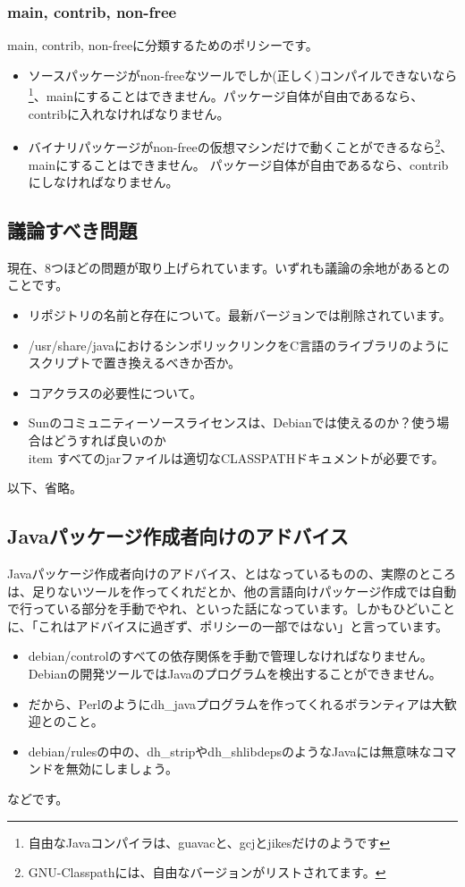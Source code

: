\documentclass[mingoth,a4paper]{jsarticle}
\begin{document}
\subsubsection{main, contrib, non-free}
main, contrib, non-freeに分類するためのポリシーです。

\begin{itemize}
\item ソースパッケージがnon-freeなツールでしか(正しく)コンパイルできないなら\footnote{自由なJavaコンパイラは、guavacと、gcjとjikesだけのようです}、mainにすることはできません。パッケージ自体が自由であるなら、contribに入れなければなりません。
\item バイナリパッケージがnon-freeの仮想マシンだけで動くことができるなら\footnote{GNU-Classpathには、自由なバージョンがリストされてます。}、mainにすることはできません。 パッケージ自体が自由であるなら、contribにしなければなりません。
\end{itemize}

\subsection{議論すべき問題}
現在、8つほどの問題が取り上げられています。いずれも議論の余地があるとのことです。
\begin{itemize}
\item リポジトリの名前と存在について。最新バージョンでは削除されています。
\item /usr/share/javaにおけるシンボリックリンクをC言語のライブラリのようにスクリプトで置き換えるべきか否か。
\item コアクラスの必要性について。
\item Sunのコミュニティーソースライセンスは、Debianでは使えるのか？使う場合はどうすれば良いのか\\item すべてのjarファイルは適切なCLASSPATHドキュメントが必要です。
\end{itemize}
以下、省略。


\subsection{Javaパッケージ作成者向けのアドバイス}
Javaパッケージ作成者向けのアドバイス、とはなっているものの、実際のところは、足りないツールを作ってくれだとか、他の言語向けパッケージ作成では自動で行っている部分を手動でやれ、といった話になっています。しかもひどいことに、「これはアドバイスに過ぎず、ポリシーの一部ではない」と言っています。

\begin{itemize}
\item debian/controlのすべての依存関係を手動で管理しなければなりません。Debianの開発ツールではJavaのプログラムを検出することができません。
\item だから、Perlのようにdh\_javaプログラムを作ってくれるボランティアは大歓迎とのこと。
\item debian/rulesの中の、dh\_stripやdh\_shlibdepsのようなJavaには無意味なコマンドを無効にしましょう。
\end{itemize}
などです。
\end{document}
